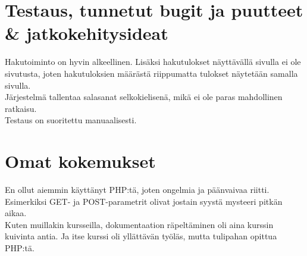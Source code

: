 \documentclass[12pt,a4paper,leqno]{report}
\begin{document}
\chapter{Testaus, tunnetut bugit ja puutteet \& jatkokehitysideat}

Hakutoiminto on hyvin alkeellinen. Lisäksi hakutulokset näyttävällä sivulla ei ole sivutusta, joten hakutuloksien määrästä riippumatta tulokset näytetään samalla sivulla.  \\

\noindent Järjestelmä tallentaa salasanat selkokielisenä, mikä ei ole paras mahdollinen ratkaisu.\\

\noindent Testaus on suoritettu manuaalisesti.

\chapter{Omat kokemukset}

En ollut aiemmin käyttänyt PHP:tä, joten ongelmia ja päänvaivaa riitti. Esimerkiksi GET- ja POST-parametrit olivat jostain syystä mysteeri pitkän aikaa.\\

\noindent Kuten muillakin kursseilla, dokumentaation räpeltäminen oli aina kurssin kuivinta antia. Ja itse kurssi oli yllättävän työläs, mutta tulipahan opittua PHP:tä.
\end{document}
